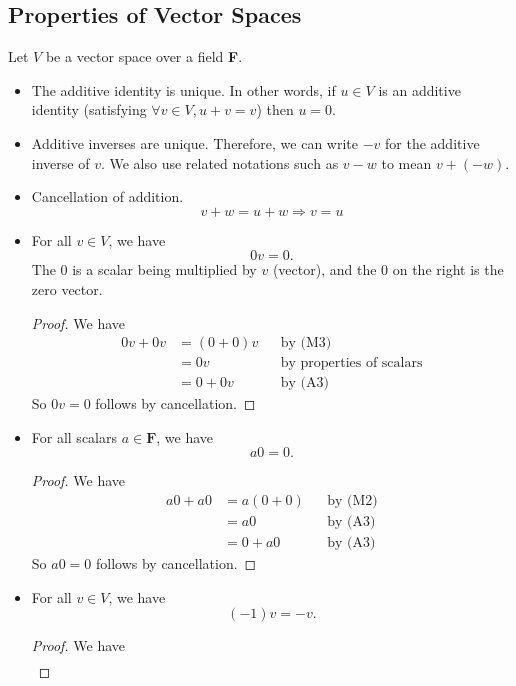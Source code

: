 \documentclass[11pt]{article}
\begin{document}
    \subsection{Properties of Vector Spaces}

    Let $V$ be a vector space over a field \textbf{F}.
    \begin{itemize}
        \item The additive identity is unique. In other words, if \(u \in V\) is an additive identity (satisfying \(\forall v \in V, u + v = v\)) then \(u = 0\).
        \item Additive inverses are unique. Therefore, we can write \(-v\) for the additive inverse of \(v\). We also use related notations such as \(v-w\) to mean \(v + (-w)\).
        \item Cancellation of addition. \[v + w = u + w \Rightarrow v = u\]
        \item For all \(v \in V\), we have \[0v = 0.\] The 0 is a scalar being multiplied by $v$ (vector), and the 0 on the right is the zero vector.
        \begin{proof}
            We have
            \begin{align*}
                0v + 0v &= (0 + 0)v && \text{by (M3)}                  \\
                        &= 0v       && \text{by properties of scalars} \\
                        &= 0 + 0v   && \text{by (A3)}
            \end{align*}
            So \(0v = 0\) follows by cancellation.
        \end{proof}
        \item For all scalars \(a \in \textbf{F}\), we have \[a0 = 0.\]
        \begin{proof}
            We have
            \begin{align*}
                a0 + a0 &= a(0 + 0) && \text{by (M2)} \\
                        &= a0       && \text{by (A3)} \\
                        &= 0 + a0   && \text{by (A3)}
            \end{align*}
            So \(a0 = 0\) follows by cancellation.
        \end{proof}
        \item For all \(v \in V\), we have \[(-1)v = -v.\]
        \begin{proof}
            We have
            \begin{align*}

\end{align*}
\end{proof}
\end{itemize}
\end{document}
